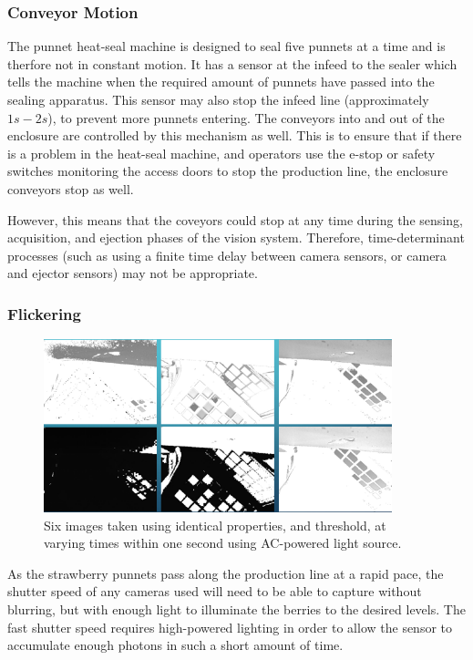 \documentclass[fleqn,twoside]{article}
\begin{document}
\subsubsection{Conveyor Motion}

The punnet heat-seal machine is designed to seal five punnets at a time and is therfore not in constant motion. It has a sensor at the infeed to the sealer which tells the machine when the required amount of punnets have passed into the sealing apparatus. This sensor may also stop the infeed line (approximately $1s-2s$), to prevent more punnets entering. The conveyors into and out of the enclosure are controlled by this mechanism as well. This is to ensure that if there is a problem in the heat-seal machine, and operators use the e-stop or safety switches monitoring the access doors to stop the production line, the enclosure conveyors stop as well.

However, this means that the coveyors could stop at any time during the sensing, acquisition, and ejection phases of the vision system. Therefore, time-determinant processes (such as using a finite time delay between camera sensors, or camera and ejector sensors) may not be appropriate. 


\subsubsection{Flickering}

\begin{figure}[h]
	\centering
	\includegraphics[width=0.9\textwidth]{flicker.png}
	\caption{Six images taken using identical properties, and threshold, at varying times within one second using AC-powered light source.}
	\label{fig:flicker}
\end{figure}

As the strawberry punnets pass along the production line at a rapid pace, the shutter speed of any cameras used will need to be able to capture without blurring, but with enough light to illuminate the berries to the desired levels. The fast shutter speed requires high-powered lighting in order to allow the sensor to accumulate enough photons in such a short amount of time.
\end{document}
